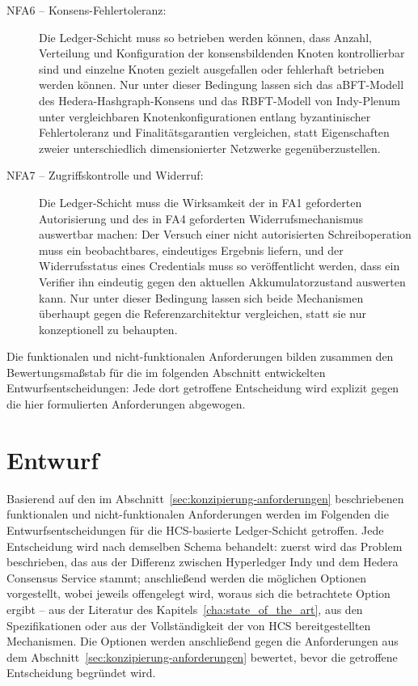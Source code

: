 \begin{description}
  \item[NFA6 -- Konsens-Fehlertoleranz:] Die Ledger-Schicht muss so betrieben werden können, dass Anzahl, Verteilung und Konfiguration der konsensbildenden Knoten kontrollierbar sind und einzelne Knoten gezielt ausgefallen oder fehlerhaft betrieben werden können. Nur unter dieser Bedingung lassen sich das aBFT-Modell des Hedera-Hashgraph-Konsens und das RBFT-Modell von Indy-Plenum unter vergleichbaren Knotenkonfigurationen entlang byzantinischer Fehlertoleranz und Finalitätsgarantien vergleichen, statt Eigenschaften zweier unterschiedlich dimensionierter Netzwerke gegenüberzustellen.
  \item[NFA7 -- Zugriffskontrolle und Widerruf:] Die Ledger-Schicht muss die Wirksamkeit der in FA1 geforderten Autorisierung und des in FA4 geforderten Widerrufsmechanismus auswertbar machen: Der Versuch einer nicht autorisierten Schreiboperation muss ein beobachtbares, eindeutiges Ergebnis liefern, und der Widerrufsstatus eines Credentials muss so veröffentlicht werden, dass ein Verifier ihn eindeutig gegen den aktuellen Akkumulatorzustand auswerten kann. Nur unter dieser Bedingung lassen sich beide Mechanismen überhaupt gegen die Referenzarchitektur vergleichen, statt sie nur konzeptionell zu behaupten.
\end{description}

Die funktionalen und nicht-funktionalen Anforderungen bilden zusammen den Bewertungsmaßstab für die im folgenden Abschnitt entwickelten Entwurfsentscheidungen: Jede dort getroffene Entscheidung wird explizit gegen die hier formulierten Anforderungen abgewogen.

\section{Entwurf}
\label{sec:konzipierung-entwurf}

Basierend auf den im Abschnitt~\ref{sec:konzipierung-anforderungen} beschriebenen funktionalen und nicht-funktionalen Anforderungen werden im Folgenden die Entwurfsentscheidungen für die HCS-basierte Ledger-Schicht getroffen. Jede Entscheidung wird nach demselben Schema behandelt: zuerst wird das Problem beschrieben, das aus der Differenz zwischen Hyperledger Indy und dem Hedera Consensus Service stammt; anschließend werden die möglichen Optionen vorgestellt, wobei jeweils offengelegt wird, woraus sich die betrachtete Option ergibt -- aus der Literatur des Kapitels~\ref{cha:state_of_the_art}, aus den Spezifikationen oder aus der Vollständigkeit der von HCS bereitgestellten Mechanismen. Die Optionen werden anschließend gegen die Anforderungen aus dem Abschnitt~\ref{sec:konzipierung-anforderungen} bewertet, bevor die getroffene Entscheidung begründet wird.

